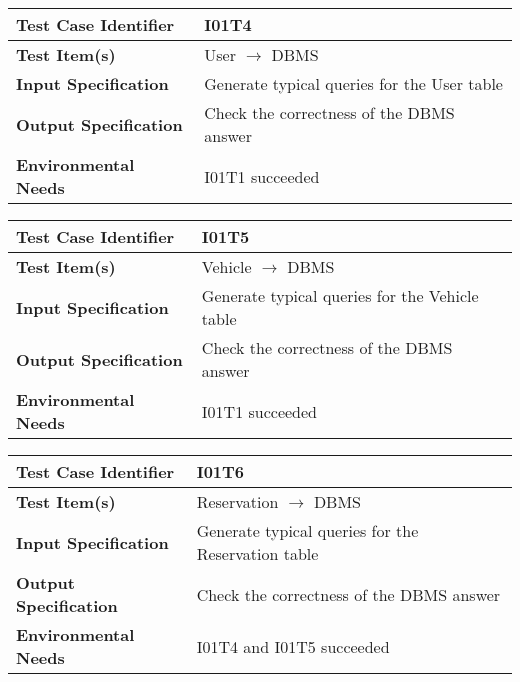 \begin{center}
	\vspace{0.6cm}
	\begin{tabular}{|l|l|}
		\hline
		\textbf{Test Case Identifier} & I01T4 \bigstrut \\\hline
		\textbf{Test Item(s)} & User \ensuremath{\rightarrow} DBMS \bigstrut \\\hline
		\textbf{Input Specification} & Generate typical queries for the User table \bigstrut \\\hline
		\textbf{Output Specification} & Check the correctness of the DBMS answer \bigstrut \\\hline
		\textbf{Environmental Needs} & I01T1 succeeded\bigstrut \\\hline
	\end{tabular}
\end{center}

\begin{center}
	\vspace{0.6cm}
	\begin{tabular}{|l|l|}
		\hline
		\textbf{Test Case Identifier} & I01T5 \bigstrut \\\hline
		\textbf{Test Item(s)} & Vehicle \ensuremath{\rightarrow} DBMS \bigstrut \\\hline
		\textbf{Input Specification} & Generate typical queries for the Vehicle table \bigstrut \\\hline
		\textbf{Output Specification} & Check the correctness of the DBMS answer \bigstrut \\\hline
		\textbf{Environmental Needs} & I01T1 succeeded\bigstrut \\\hline
	\end{tabular}
\end{center}

\begin{center}
	\vspace{0.6cm}
	\begin{tabular}{|l|l|}
		\hline
		\textbf{Test Case Identifier} & I01T6 \bigstrut \\\hline
		\textbf{Test Item(s)} & Reservation \ensuremath{\rightarrow} DBMS \bigstrut \\\hline
		\textbf{Input Specification} & Generate typical queries for the Reservation table \bigstrut \\\hline
		\textbf{Output Specification} & Check the correctness of the DBMS answer \bigstrut \\\hline
		\textbf{Environmental Needs} & I01T4 and I01T5 succeeded\bigstrut \\\hline
	\end{tabular}
\end{center}

